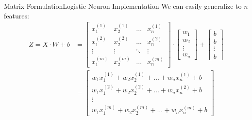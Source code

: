 \documentclass[aspectratio=169]{beamer}
\begin{document}
\begin{frame}{Matrix Formulation}{Logistic Neuron Implementation}
We can easily generalize to $n$ features:
\vspace{0.5cm}
\begin{align*}
Z = X \cdot W + b &= \begin{bmatrix}
x_1^{(1)} & x_2^{(1)} & \dots   & x_n^{(1)} \\
x_1^{(2)} & x_2^{(2)} & \dots   & x_n^{(2)} \\
\vdots    & \vdots    & \ddots  & \vdots    \\
x_1^{(m)} & x_2^{(m)} & \dots   & x_n^{(m)}
\end{bmatrix}
\cdot
\begin{bmatrix}
w_1    \\
w_2    \\
\vdots \\
w_n
\end{bmatrix}
+
\begin{bmatrix}
b \\
b \\
\vdots \\
b
\end{bmatrix} \\
&= \begin{bmatrix}
w_1 x_1^{(1)} + w_2 x_2^{(1)} + \dots + w_n x_n^{(1)} + b \\
w_1 x_1^{(2)} + w_2 x_2^{(2)} + \dots + w_n x_n^{(2)} + b \\
\vdots \\
w_1 x_1^{(m)} + w_2 x_2^{(m)} + \dots + w_n x_n^{(m)} + b
\end{bmatrix}
\end{align*}
\end{frame}
%
%
\end{document}
